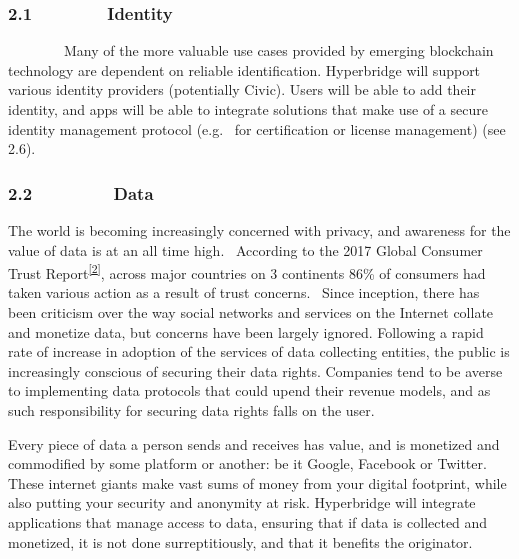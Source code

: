 \documentclass[]{article}
\begin{document}
\hypertarget{h.ukaigmyfvdlo}{%
\subsubsection{\texorpdfstring{{2.1~~~~~~~~Identity}}{2.1~~~~~~~~Identity}}\label{h.ukaigmyfvdlo}}

{~~~~~~~~Many of the more valuable use cases provided by emerging
blockchain technology are dependent on reliable identification.
Hyperbridge will support various identity providers (potentially Civic).
Users will be able to add their identity, and apps will be able to
integrate solutions that make use of a secure identity management
protocol (e.g. ~for certification or license management) (see 2.6).}

\hypertarget{h.kgi69li2zlx8}{%
\subsubsection{\texorpdfstring{{2.2 ~~~~~~~~Data
}}{2.2 ~~~~~~~~Data }}\label{h.kgi69li2zlx8}}

{The world is becoming increasingly concerned with privacy, and
awareness for the value of data is at an all time high. ~According to
the 2017 Global Consumer Trust
Report}\textsuperscript{\protect\hyperlink{ftnt2}{{[}2{]}}}{, across
major countries on 3 continents 86\% of consumers had taken various
action as a result of trust concerns. ~Since inception, there has been
criticism over the way social networks and services on the Internet
collate and monetize data, but concerns have been largely ignored.
Following a rapid rate of increase in adoption of the services of data
collecting entities, the public is increasingly conscious of securing
their data rights. Companies tend to be averse to implementing data
protocols that could upend their revenue models, and as such
responsibility for securing data rights falls on the user.}

{}

{Every piece of data a person sends and receives has value, and is
monetized and commodified by some platform or another: be it Google,
Facebook or Twitter. These internet giants make vast sums of money from
your digital footprint, while also putting your security and anonymity
at risk. Hyperbridge will integrate applications that manage access to
data, ensuring that if data is collected and monetized, it is not done
surreptitiously, and that it benefits the originator.}

{}

{}
\end{document}
